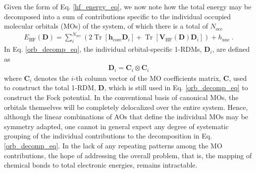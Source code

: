 \documentclass[journal=jctc,manuscript=article]{achemso}
\DeclareMathOperator{\tr}{Tr}
\begin{document}
Given the form of Eq. \ref{hf_energy_eq}, we now note how the total energy may be decomposed into a sum of contributions specific to the individual occupied molecular orbitals (MOs) of the system, of which there is a total of $N_{\text{occ}}$
%
\begin{align}
E_{\text{HF}}(\bm{D}) = \sum^{N_{\text{occ}}}_{i}(2\tr[\bm{h}_{\text{core}}\bm{D}_i] + \tr[\bm{V}_{\text{HF}}(\bm{D})\bm{D}_i]) + h_{\text{nuc}} \ . \label{orb_decomp_eq}
\end{align}
%
In Eq. \ref{orb_decomp_eq}, the individual orbital-specific 1-RDMs, $\bm{D}_i$, are defined as
%
\begin{align}
\bm{D}_i = \bm{C}_{i} \otimes \bm{C}_{i} \label{orb_spec_1rdm_eq}
\end{align}
%
where $\bm{C}_i$ denotes the $i$-th column vector of the MO coefficients matrix, $\bm{C}$, used to construct the total 1-RDM, $\bm{D}$, which is still used in Eq. \ref{orb_decomp_eq} to construct the Fock potential. In the conventional basis of canonical MOs, the orbitals themselves will be completely delocalized over the entire system. Hence, although the linear combinations of AOs that define the individual MOs may be symmetry adapted, one cannot in general expect any degree of systematic grouping of the individual contributions to the decomposition in Eq. \ref{orb_decomp_eq}. In the lack of any repeating patterns among the MO contributions, the hope of addressing the overall problem, that is, the mapping of chemical bonds to total electronic energies, remains intractable.\\
\end{document}
